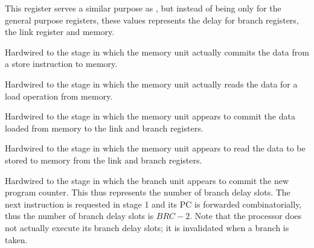 This register serves a similar purpose as , but instead of being only
for the general purpose registers, these values represents the delay for branch
registers, the link register and memory.

\reset{****}
Hardwired to the stage in which the memory unit actually commits the data from
a store instruction to memory.

\implementation{}

\reset{****}
Hardwired to the stage in which the memory unit actually reads the data for a
load operation from memory.

\implementation{}

\reset{****}
Hardwired to the stage in which the memory unit appears to commit the data
loaded from memory to the link and branch registers.

\implementation{}

\reset{****}
Hardwired to the stage in which the memory unit appears to read the data to be
stored to memory from the link and branch registers.

\implementation{}

\reset{****}
Hardwired to the stage in which the branch unit appears to commit the new
program counter. This thus represents the number of branch delay slots. The next
instruction is requested in stage 1 and its PC is forwarded combinatorially,
thus the number of branch delay slots is $BRC - 2$. Note that the \rvex{}
processor does not actually execute its branch delay slots; it is invalidated
when a branch is taken.

